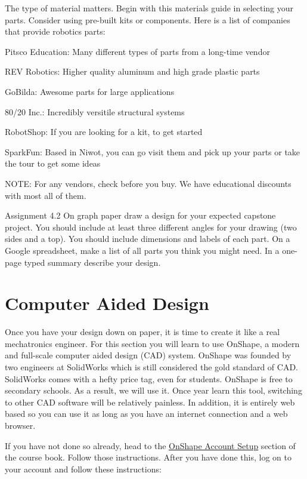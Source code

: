 \documentclass[
]{book}
\begin{document}
The type of material matters. Begin with this materials guide in selecting your parts. Consider using pre-built kits or components. Here is a list of companies that provide robotics parts:

Pitsco Education: Many different types of parts from a long-time vendor

REV Robotics: Higher quality aluminum and high grade plastic parts

GoBilda: Awesome parts for large applications

80/20 Inc.: Incredibly versitile structural systems

RobotShop: If you are looking for a kit, to get started

SparkFun: Based in Niwot, you can go visit them and pick up your parts or take the tour to get some ideas

NOTE: For any vendors, check before you buy. We have educational discounts with most all of them.

Assignment 4.2
On graph paper draw a design for your expected capstone project. You should include at least three different angles for your drawing (two sides and a top). You should include dimensions and labels of each part. On a Google spreadsheet, make a list of all parts you think you might need. In a one-page typed summary describe your design.

\hypertarget{computer-aided-design}{%
\section{Computer Aided Design}\label{computer-aided-design}}

Once you have your design down on paper, it is time to create it like a real mechatronics engineer. For this section you will learn to use OnShape, a modern and full-scale computer aided design (CAD) system. OnShape was founded by two engineers at SolidWorks which is still considered the gold standard of CAD. SolidWorks comes with a hefty price tag, even for students. OnShape is free to secondary schools. As a result, we will use it. Once year learn this tool, switching to other CAD software will be relatively painless. In addition, it is entirely web based so you can use it as long as you have an internet connection and a web browser.

If you have not done so already, head to the \protect\hyperlink{onshape-account-setup}{OnShape Account Setup} section of the course book. Follow those instructions. After you have done this, log on to your account and follow these instructions:
\end{document}
